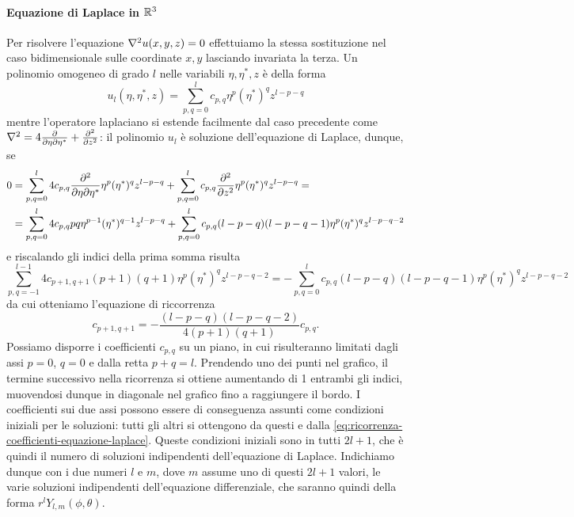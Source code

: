 \paragraph{Equazione di Laplace in $\mathbb{R}^3$}
Per risolvere l'equazione $\nabla^2 u(x,y,z)=0$ effettuiamo la stessa sostituzione nel caso bidimensionale sulle coordinate $x,y$ lasciando invariata la terza.
Un polinomio omogeneo di grado $l$ nelle variabili $\eta,\eta^*,z$ è della forma
\begin{equation}
	u_l(\eta,\eta^*,z)=\sum_{p,q=0}^lc_{p,q}\eta^p(\eta^*)^qz^{l-p-q}
\end{equation}
mentre l'operatore laplaciano si estende facilmente dal caso precedente come $\nabla^2=4\frac{\partial}{\partial\eta\partial\eta^*}+\frac{\partial^2}{\partial z^2}$: il polinomio $u_l$ è soluzione dell'equazione di Laplace, dunque, se
\begin{equation}
	\begin{split}
		0&=\sum_{p,q=0}^l4c_{p,q}\frac{\partial^2}{\partial\eta\partial\eta^*}\eta^p(\eta^*)^qz^{l-p-q}+\sum_{p,q=0}^lc_{p,q}\frac{\partial^2 {}}{\partial {z}^2}\eta^p(\eta^*)^qz^{l-p-q}=\\
		&=\sum_{p,q=0}^l4c_{p,q}pq\eta^{p-1}(\eta^*)^{q-1}z^{l-p-q}+\sum_{p,q=0}^lc_{p,q}(l-p-q)(l-p-q-1)\eta^p(\eta^*)^qz^{l-p-q-2}
	\end{split}
\end{equation}
e riscalando gli indici della prima somma risulta
\begin{equation}
	\sum_{p,q=-1}^{l-1}4c_{p+1,q+1}(p+1)(q+1)\eta^{p}(\eta^*)^{q}z^{l-p-q-2}=-\sum_{p,q=0}^lc_{p,q}(l-p-q)(l-p-q-1)\eta^p(\eta^*)^qz^{l-p-q-2}
\end{equation}
da cui otteniamo l'equazione di riccorrenza
\begin{equation}
	c_{p+1,q+1}=-\frac{(l-p-q)(l-p-q-2)}{4(p+1)(q+1)}c_{p,q}.
	\label{eq:ricorrenza-coefficienti-equazione-laplace}
\end{equation}
Possiamo disporre i coefficienti $c_{p,q}$ su un piano, in cui risulteranno limitati dagli assi $p=0$, $q=0$ e dalla retta $p+q=l$.
Prendendo uno dei punti nel grafico, il termine successivo nella ricorrenza si ottiene aumentando di 1 entrambi gli indici, muovendosi dunque in diagonale nel grafico fino a raggiungere il bordo.
I coefficienti sui due assi possono essere di conseguenza assunti come condizioni iniziali per le soluzioni: tutti gli altri si ottengono da questi e dalla \eqref{eq:ricorrenza-coefficienti-equazione-laplace}.
Queste condizioni iniziali sono in tutti $2l+1$, che è quindi il numero di soluzioni indipendenti dell'equazione di Laplace.
Indichiamo dunque con i due numeri $l$ e $m$, dove $m$ assume uno di questi $2l+1$ valori, le varie soluzioni indipendenti dell'equazione differenziale, che saranno quindi della forma $r^lY_{l,m}(\phi,\theta)$.

